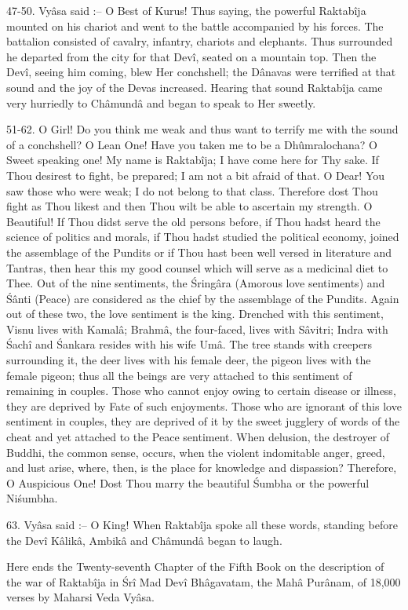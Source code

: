 47-50. Vy\^asa said :-- O Best of Kurus! Thus saying, the powerful Raktab\^ija mounted on his chariot and went to the battle accompanied by his forces. The battalion consisted of cavalry, infantry, chariots and elephants. Thus surrounded he departed from the city for that Dev\^i, seated on a mountain top. Then the Dev\^i, seeing him coming, blew Her conchshell; the D\^anavas were terrified at that sound and the joy of the Devas increased. Hearing that sound Raktab\^ija came very hurriedly to Ch\^amund\^a and began to speak to Her sweetly.

51-62. O Girl! Do you think me weak and thus want to terrify me with the sound of a conchshell? O Lean One! Have you taken me to be a Dh\^umralochana? O Sweet speaking one! My name is Raktab\^ija; I have come here for Thy sake. If Thou desirest to fight, be prepared; I am not a bit afraid of that. O Dear! You saw those who were weak; I do not belong to that class. Therefore dost Thou fight as Thou likest and then Thou wilt be able to ascertain my strength. O Beautiful! If Thou didst serve the old persons before, if Thou hadst heard the science of politics and morals, if Thou hadst studied the political economy, joined the assemblage of the Pundits or if Thou hast been well versed in literature and Tantras, then hear this my good counsel which will serve as a medicinal diet to Thee. Out of the nine sentiments, the \'Sring\^ara (Amorous love sentiments) and \'S\^anti (Peace) are considered as the chief by the assemblage of the Pundits. Again out of these two, the love sentiment is the king. Drenched with this sentiment, Visnu lives with Kamal\^a; Brahm\^a, the four-faced, lives with S\^avitri; Indra with \'Sach\^i and \'Sankara resides with his wife Um\^a. The tree stands with creepers surrounding it, the deer lives with his female deer, the pigeon lives with the female pigeon; thus all the beings are very attached to this sentiment of remaining in couples. Those who cannot enjoy owing to certain disease or illness, they are deprived by Fate of such enjoyments. Those who are ignorant of this love sentiment in couples, they are deprived of it by the sweet jugglery of words of the cheat and yet attached to the Peace sentiment. When delusion, the destroyer of Buddhi, the common sense, occurs, when the violent indomitable anger, greed, and lust arise, where, then, is the place for knowledge and dispassion? Therefore, O Auspicious One! Dost Thou marry the beautiful \'Sumbha or the powerful Ni\'sumbha.

63. Vy\^asa said :-- O King! When Raktab\^ija spoke all these words, standing before the Dev\^i K\^alik\^a, Ambik\^a and Ch\^amund\^a began to laugh.

Here ends the Twenty-seventh Chapter of the Fifth Book on the description of the war of Raktab\^ija in \'Sr\^i Mad Dev\^i Bh\^agavatam, the Mah\^a Pur\^anam, of 18,000 verses by Maharsi Veda Vy\^asa.